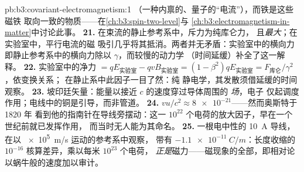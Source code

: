 \begin{solution}{pb:b3:covariant-electromagnetism:1}
（一种内禀的、量子的“电流”），而铁是这些磁铁
取向一致的物质——在\cref{ch:b3:spin-two-level}与
\cref{ch:b3:electromagnetism-in-matter}中讨论此事。
\textbf{21.} 在束流的静止参考系中，斥力为纯库仑力，
且\emph{最大}；在实验室中，平行电流的磁
吸引几乎将其抵消。两者并无矛盾：实验室中的横向力
即静止参考系中的横向力除以 $\gamma$，而较慢的动力学
（时间延缓）补全了这一解释。
\textbf{22.} 实验室中的净力 $= qE_{\text{实验室}} - qvB_{\text{实验室}} =
(1 - \beta^2)qE_{\text{实验室}} = F_{\text{库仑}}/\gamma^2$，依变换关系；
在静止系中此因子一目了然：纯
静电学，其发散须借延缓的时间观察。
\textbf{23.} 坡印廷矢量：能量以接近 $c$ 的速度穿过导体周围的
\emph{场}，电子
仅起调度作用；电线中的铜是引导，而非管道。
\textbf{24.} $vu/c^2 \approx \num{8e-21}$——然而奥斯特于 1820 年
看到他的指南针在导线旁摆动：这一
$10^{22}$ 个电荷的放大因子，早在一个世纪前就已发挥作用，
而当时无人能为其命名。
\textbf{25.} 一根电中性的 \qty{10}{A} 导线，在以 \qty{e5}{m/s} 运动的参考系中观察，
带有 $\qty{-1.1e-11}{C/m}$：长度收缩的 $10^{-16}$
核算差异，乘以每米 $10^{23}$ 个电荷，
\emph{正是}磁力——磁现象的全部，即相对论
以蜗牛般的速度加以审计。
\end{solution}
